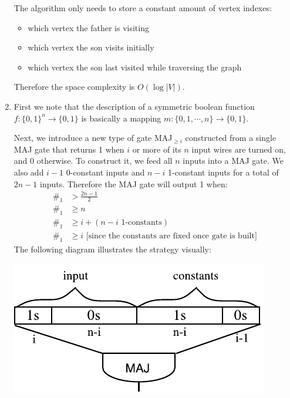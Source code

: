 \documentclass{article}
\begin{document}
\begin{enumerate}
The algorithm only needs to store a constant amount of vertex indexes:
\begin{itemize}
\item which vertex the father is visiting
\item which vertex the son visits initially
\item which vertex the son last visited while traversing the graph
\end{itemize}
Therefore the space complexity is $O(\log |V|)$.

\newpage
\item First we note that the description of a symmetric boolean function $f:\{0,1\}^n\rightarrow \{0,1\}$ is basically a mapping $m:\{0,1,\cdots,n\}\rightarrow \{0,1\}$.


Next, we introduce a new type of gate MAJ$_{\geq i}$ constructed from a single MAJ gate that returns 1 when $i$ or more of its $n$ input wires are turned on, and 0 otherwise. To construct it, we feed all $n$ inputs into a MAJ gate. We also add $i-1$ 0-constant inputs and $n-i$ 1-constant inputs for a total of $2n-1$ inputs. Therefore the MAJ gate will output 1 when:
\begin{align*}
\#_1 &> \frac{2n-1}{2} \\
\#_1 &\geq n \\
\#_1 &\geq i + (n-i \text{ 1-constants}) \\
\#_1 &\geq i \text{ [since the constants are fixed once gate is built]}
\end{align*}
The following diagram illustrates the strategy visually:

\includegraphics{q3_maj_geq.pdf}

\end{enumerate}
\end{document}
